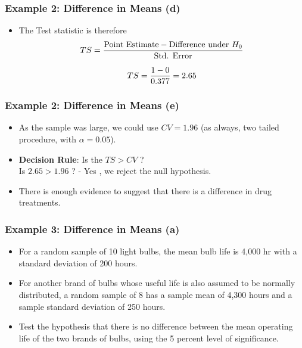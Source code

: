 \documentclass[a4]{beamer}
\begin{document}
\begin{frame}[fragile]
\frametitle{Example 2: Difference in Means (d) }
\vspace{-1cm}
\begin{itemize}
\item The Test statistic is therefore
\[ TS = {\mbox{Point Estimate} - \mbox{Difference under } H_0 \over \mbox{Std. Error}} \]

\[TS = {1 - 0 \over 0.377 } = 2.65 \]


\end{itemize}
\end{frame}


\begin{frame}[fragile]
\frametitle{Example 2: Difference in Means (e) }
\vspace{-1cm}
\begin{itemize}
\item As the sample was large, we could use $CV = 1.96$ (as always, two tailed procedure, with $\alpha=0.05$).

\item \textbf{Decision Rule}: Is the $TS > CV$ ? \\  Is $2.65 > 1.96$ ? - Yes , we reject the null hypothesis.
\item There is enough evidence to suggest that there is a difference in drug treatments.
\end{itemize}
\end{frame}




\begin{frame}
\frametitle{Example 3: Difference in Means (a) }
\vspace{-1cm}
\begin{itemize}
\item For a random sample of 10 light bulbs, the mean bulb life is 4,000 hr with a standard deviation of 200 hours.
\item For another brand of bulbs whose useful life is also assumed to be normally distributed, a random sample of 8 has a sample mean of 4,300 hours
and a sample standard deviation of 250 hours. \item Test the hypothesis that there is no difference between the
mean operating life of the two brands of bulbs, using the 5 percent level of significance.
\end{itemize}
\end{frame}
\end{document}
